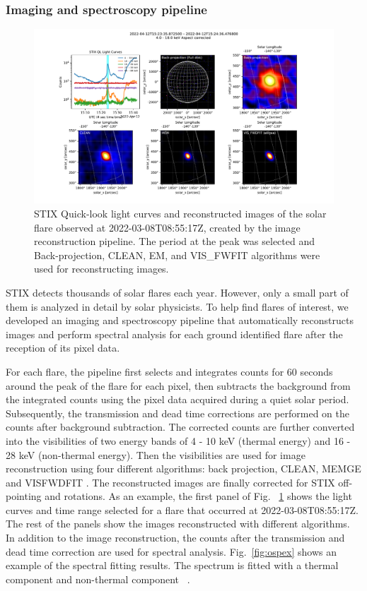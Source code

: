 \documentclass[referee]{aa} %
\begin{document}
\subsubsection{Imaging and spectroscopy pipeline}
\begin{figure}
  \centering
  \includegraphics[width=0.95\linewidth]{figures/imaging_pipeline.pdf}
  \caption{ 
   STIX Quick-look light curves and reconstructed images of the solar flare observed at 2022-03-08T08:55:17Z, 
   created by the image reconstruction pipeline.  The period at the peak was selected and 
   Back-projection, CLEAN, EM, and VIS\_FWFIT
    algorithms were used for reconstructing images. }
  \label{fig:imaging}
\end{figure}
STIX detects thousands of solar flares each year. However, only a small part of them is analyzed in detail by solar physicists. 
To help find flares of interest, we  developed an imaging and spectroscopy pipeline that automatically reconstructs images and perform spectral analysis for each ground identified flare after the reception of its pixel data. 

 For each flare, the pipeline first selects and integrates counts for 60 seconds around the peak of the flare for each pixel, then subtracts the background from the integrated counts using the pixel data acquired during a quiet solar period. 
 Subsequently, the transmission and dead time corrections are performed on the counts after background subtraction. The corrected counts are further converted into the visibilities of two energy bands of 4 - 10 keV (thermal energy) and 16 - 28 keV (non-thermal energy). 
Then the visibilities are used for image reconstruction using four different algorithms: back projection, CLEAN, MEM\textunderscore GE and VIS\textunderscore FWDFIT \cite{paolo2022,clean,mem}.
The reconstructed images are finally corrected  for STIX off-pointing and rotations. 
As an example,  the first panel of Fig. ~\ref{fig:imaging} shows the light curves and time range selected for a flare that occurred at 2022-03-08T08:55:17Z.
The rest of the panels show the images reconstructed with different algorithms. 
In addition to the image reconstruction, the counts after the transmission and dead time correction are used for spectral analysis.  Fig.~\ref{fig:ospex} shows an example of the spectral fitting results. The spectrum is fitted with a thermal component and non-thermal component ~\cite{andrea2021}. 
\end{document}
